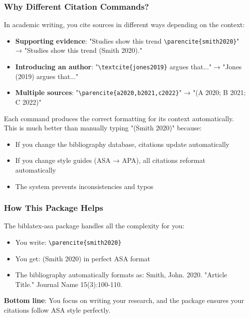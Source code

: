 \documentclass[11pt,a4paper]{ltxdoc}
\begin{document}
\subsubsection{Why Different Citation Commands?}

In academic writing, you cite sources in different ways depending on the context:

\begin{itemize}
  \item \textbf{Supporting evidence}: "Studies show this trend \texttt{\textbackslash parencite\{smith2020\}}" → "Studies show this trend (Smith 2020)."
  \item \textbf{Introducing an author}: "\texttt{\textbackslash textcite\{jones2019\}} argues that..." → "Jones (2019) argues that..."
  \item \textbf{Multiple sources}: "\texttt{\textbackslash parencite\{a2020,b2021,c2022\}}" → "(A 2020; B 2021; C 2022)"
\end{itemize}

Each command produces the correct formatting for its context automatically. This is much better than manually typing "(Smith 2020)" because:
\begin{itemize}
  \item If you change the bibliography database, citations update automatically
  \item If you change style guides (ASA → APA), all citations reformat automatically  
  \item The system prevents inconsistencies and typos
\end{itemize}

\subsubsection{How This Package Helps}

The \textsf{biblatex-asa} package handles all the complexity for you:
\begin{itemize}
  \item You write: \texttt{\textbackslash parencite\{smith2020\}}
  \item You get: (Smith 2020) in perfect ASA format
  \item The bibliography automatically formats as: Smith, John. 2020. "Article Title." Journal Name 15(3):100-110.
\end{itemize}

\textbf{Bottom line}: You focus on writing your research, and the package ensures your citations follow ASA style perfectly.
\end{document}

